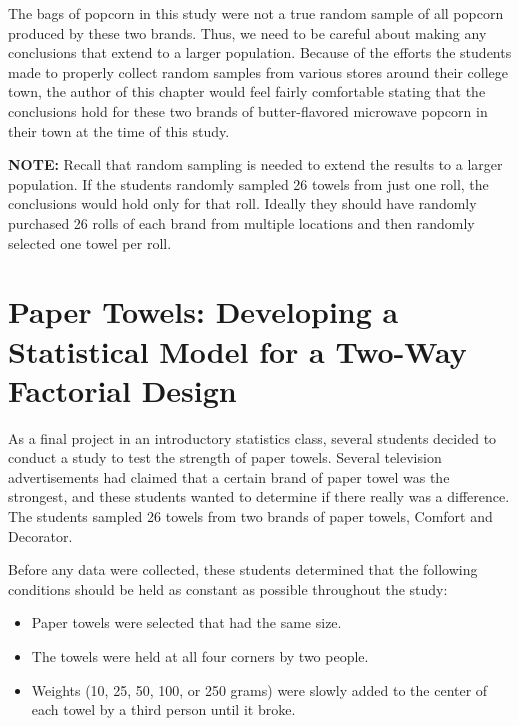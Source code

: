 \documentclass[
]{report}
\providecommand{\tightlist}{%
  \setlength{\itemsep}{0pt}\setlength{\parskip}{0pt}}
\begin{document}
The bags of popcorn in this study were not a true random sample of all popcorn produced by these two brands. Thus, we need to be careful about making any conclusions that extend to a larger population. Because of the efforts the students made to properly collect random samples from various stores around their college town, the author of this chapter would feel fairly comfortable stating that the conclusions hold for these two brands of butter-flavored microwave popcorn in their town at the time of this study.

\large

\textbf{NOTE:}
Recall that random sampling is needed to extend the results to a larger population. If the students randomly sampled 26 towels from just one roll, the conclusions would hold only for that roll. Ideally they should have randomly purchased 26 rolls of each brand from multiple locations and then randomly selected one towel per roll.
\normalsize

\hypertarget{paper-towels-developing-a-statistical-model-for-a-two-way-factorial-design}{%
\section{\texorpdfstring{\textbf{Paper Towels: Developing a Statistical Model for a Two-Way Factorial Design}}{Paper Towels: Developing a Statistical Model for a Two-Way Factorial Design}}\label{paper-towels-developing-a-statistical-model-for-a-two-way-factorial-design}}

As a final project in an introductory statistics class, several students decided to conduct a study to test the strength of paper towels. Several television advertisements had claimed that a certain brand of paper towel was the strongest, and these students wanted to determine if there really was a difference. The students sampled 26 towels from two brands of paper towels, Comfort and Decorator.

Before any data were collected, these students determined that the following conditions should be held as constant as possible throughout the study:

\begin{itemize}
\tightlist
\item
  Paper towels were selected that had the same size.
\item
  The towels were held at all four corners by two people.
\item
  Weights (10, 25, 50, 100, or 250 grams) were slowly added to the center of each towel by a third person until it broke.
\end{itemize}
\end{document}
